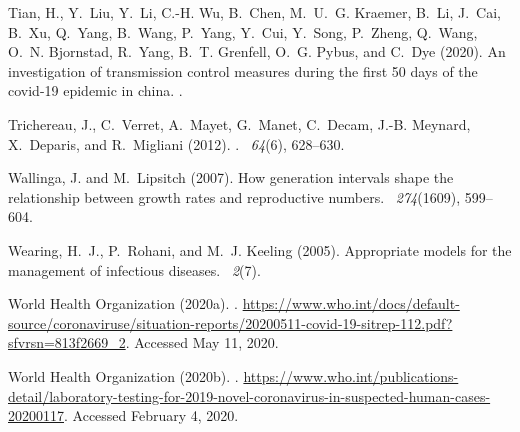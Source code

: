 \documentclass[12pt]{article}
\begin{document}
\begin{thebibliography}{}
Tian, H., Y.~Liu, Y.~Li, C.-H. Wu, B.~Chen, M.~U.~G. Kraemer, B.~Li, J.~Cai,
  B.~Xu, Q.~Yang, B.~Wang, P.~Yang, Y.~Cui, Y.~Song, P.~Zheng, Q.~Wang, O.~N.
  Bjornstad, R.~Yang, B.~T. Grenfell, O.~G. Pybus, and C.~Dye (2020).
\newblock An investigation of transmission control measures during the first 50
  days of the covid-19 epidemic in china.
.

Trichereau, J., C.~Verret, A.~Mayet, G.~Manet, C.~Decam, J.-B. Meynard,
  X.~Deparis, and R.~Migliani (2012).
.
~{\em 64\/}(6), 628--630.

Wallinga, J. and M.~Lipsitch (2007).
\newblock How generation intervals shape the relationship between growth rates
  and reproductive numbers.
~{\em 274\/}(1609), 599--604.

Wearing, H.~J., P.~Rohani, and M.~J. Keeling (2005).
\newblock Appropriate models for the management of infectious diseases.
~{\em 2\/}(7).

{World Health Organization} (2020a).
.
\newblock
  \url{https://www.who.int/docs/default-source/coronaviruse/situation-reports/20200511-covid-19-sitrep-112.pdf?sfvrsn=813f2669_2}.
  Accessed May 11, 2020.

{World Health Organization} (2020b).
.
\newblock
  \url{https://www.who.int/publications-detail/laboratory-testing-for-2019-novel-coronavirus-in-suspected-human-cases-20200117}.
  Accessed February 4, 2020.


\end{thebibliography}
\end{document}
